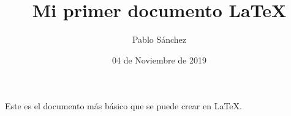 \documentclass{article}
\title{Mi primer documento \LaTeX}
\author{Pablo Sánchez}
\date{04 de Noviembre de 2019}
\begin{document}
\maketitle

Este es el documento más básico que se puede crear en \LaTeX.
\end{document}
